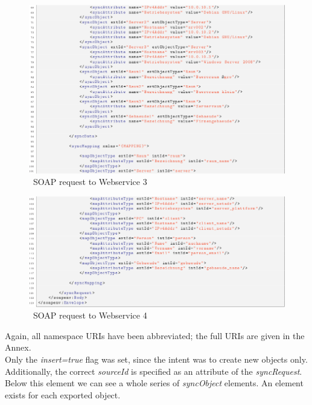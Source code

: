 \documentclass[a4paper,10pt]{book}
\begin{document}
\begin{figure}[htb!]
  \centering
  \includegraphics[scale=.55]{Screenshot/SyncAPI_Fallstudie_07-en.png}
  \caption{\label{SOAP request to Webservice 3} \ SOAP request to Webservice 3}
\end{figure}
\newline
\begin{figure}[htb!]
  \centering
  \includegraphics[scale=.55]{Screenshot/SyncAPI_Fallstudie_06-en.png}
  \caption{\label{SOAP request to Webservice 4} \ SOAP request to Webservice 4}
\end{figure}
\newline
Again, all namespace URIs have been abbreviated; the full URIs are given in the Annex.
\newline\\
Only the \textit{insert=true} flag was set, since the intent was to create new objects only. Additionally, the correct
\textit{sourceId} is specified as an attribute of the \textit{syncRequest}. Below this element we can see a whole series of
\textit{syncObject} elements. An element exists for each exported object.
\newline\newline
\end{document}
